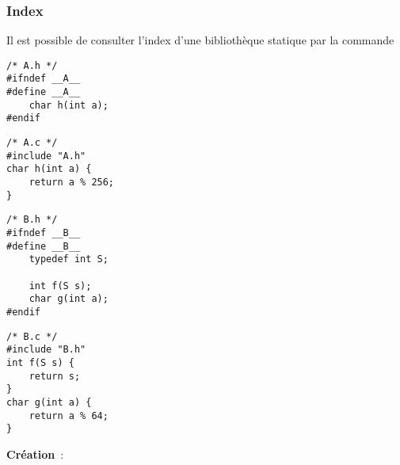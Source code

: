 \begin{frame}[fragile]
\frametitle{Index}
Il est possible de \alert{consulter l'index} d'une bibliothèque statique
 par la commande
\begin{center}
\end{center}
\medskip

\begin{center}
\begin{minipage}[c]{.22\textwidth}
\begin{lstlisting}[frame=single,numbers=none,basicstyle=\scriptsize\tt]
/* A.h */
#ifndef __A__
#define __A__
    char h(int a);
#endif
\end{lstlisting}
\end{minipage}
\enspace
\begin{minipage}[c]{.23\textwidth}
\begin{lstlisting}[frame=single,numbers=none,basicstyle=\scriptsize\tt]
/* A.c */
#include "A.h"
char h(int a) {
    return a % 256;
}
\end{lstlisting}
\end{minipage}
\quad
\begin{minipage}[c]{.23\textwidth}
\begin{lstlisting}[frame=single,numbers=none,basicstyle=\scriptsize\tt]
/* B.h */
#ifndef __B__
#define __B__
    typedef int S;

    int f(S s);
    char g(int a);
#endif
\end{lstlisting}
\end{minipage}
\enspace
\begin{minipage}[c]{.22\textwidth}
\begin{lstlisting}[frame=single,numbers=none,basicstyle=\scriptsize\tt]
/* B.c */
#include "B.h"
int f(S s) {
    return s;
}
char g(int a) {
    return a % 64;
}
\end{lstlisting}
\end{minipage}
\end{center}

\begin{center}
\begin{minipage}[c]{.4\textwidth}
{\bf Création}~: \\
\begin{small}
 \\
 \\
\end{small}
\medskip


\end{minipage}
\end{center}
\end{frame}
